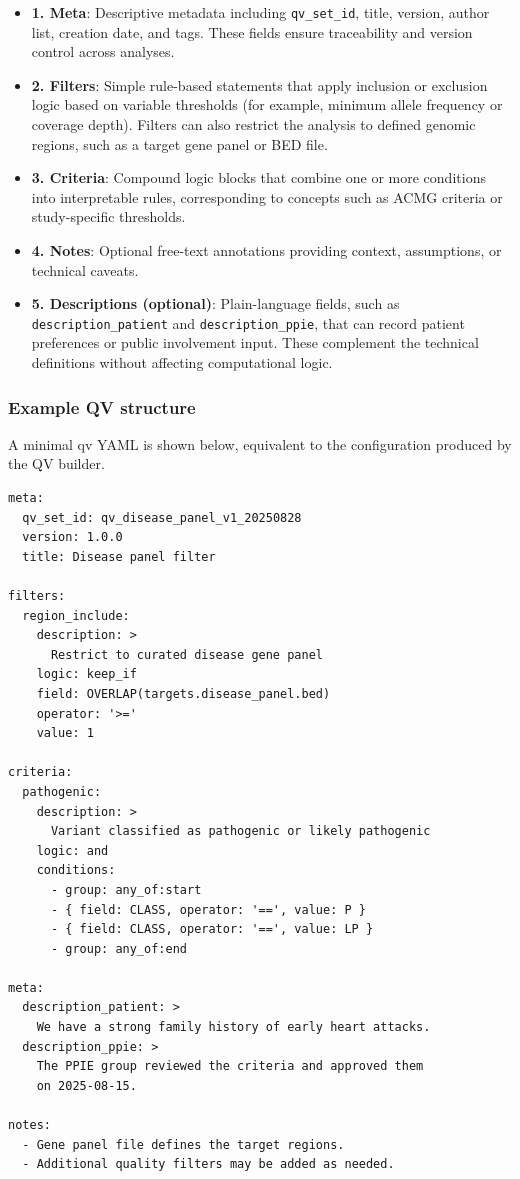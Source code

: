 \begin{itemize}
    \item \textbf{1. Meta}: Descriptive metadata including \texttt{qv\_set\_id}, title, version, author list, creation date, and tags. These fields ensure traceability and version control across analyses.
    \item \textbf{2. Filters}: Simple rule-based statements that apply inclusion or exclusion logic based on variable thresholds (for example, minimum allele frequency or coverage depth). Filters can also restrict the analysis to defined genomic regions, such as a target gene panel or BED file.
    \item \textbf{3. Criteria}: Compound logic blocks that combine one or more conditions into interpretable rules, corresponding to concepts such as ACMG criteria or study-specific thresholds.
    \item \textbf{4. Notes}: Optional free-text annotations providing context, assumptions, or technical caveats.
    \item \textbf{5. Descriptions (optional)}: Plain-language fields, such as \texttt{description\_patient} and \texttt{description\_ppie}, that can record patient preferences or public involvement input. These complement the technical definitions without affecting computational logic.
\end{itemize}


\subsubsection*{Example QV structure}
A minimal \ac{qv} YAML is shown below, equivalent to the configuration produced by the QV builder.

\begin{tcolorbox}[
    colback=white!0,
    colframe=black,
    boxrule=1pt,
    arc=1mm,
    outer arc=1mm,
    title=\textbf{\refstepcounter{myboxcounter}\label{box:qv_example}Box \themyboxcounter: qv\_disease\_panel\_example.yaml}
]
\begin{verbatim}
meta:
  qv_set_id: qv_disease_panel_v1_20250828
  version: 1.0.0
  title: Disease panel filter

filters:
  region_include:
    description: >
      Restrict to curated disease gene panel
    logic: keep_if
    field: OVERLAP(targets.disease_panel.bed)
    operator: '>='
    value: 1

criteria:
  pathogenic:
    description: >
      Variant classified as pathogenic or likely pathogenic
    logic: and
    conditions:
      - group: any_of:start
      - { field: CLASS, operator: '==', value: P }
      - { field: CLASS, operator: '==', value: LP }
      - group: any_of:end

meta:
  description_patient: >
    We have a strong family history of early heart attacks.
  description_ppie: >
    The PPIE group reviewed the criteria and approved them
    on 2025-08-15.
    
notes:
  - Gene panel file defines the target regions.
  - Additional quality filters may be added as needed.
\end{verbatim}
\end{tcolorbox}

